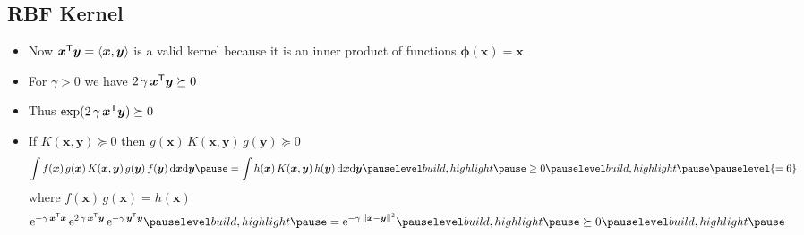 \begin{slide}
\section[-2]{RBF Kernel}

\begin{PauseHighLight}
  \begin{itemize}
  \item Now $\bm{x}^{\textsf{T}}\bm{y} = \left\langle {\bm{x}}, {\bm{y}}\right\rangle$ is a valid
    kernel because it is an inner product of functions $\bm{\phi}(\bm{x}) =
    \bm{x}$\pause
  \item For $\gamma>0$ we have $2\,\gamma\,\bm{x}^{\textsf{T}}\bm{y}\succeq 0$\pause
  \item Thus $\exp(2\,\gamma\,\bm{x}^{\textsf{T}}\bm{y}) \succeq 0$\pause
  \item If $K(\bm{x},\bm{y})\succeq0$ then
    $g(\bm{x})\,K(\bm{x},\bm{y})\,g(\bm{y}) \succeq 0$\pause
    {\small
    \begin{align*}
      \int f(\bm{x})\, g(\bm{x})\,K(\bm{x}, \bm{y}) \,g(\bm{y})\,
      f(\bm{y}) \, \dd \bm{x} \dd \bm{y}  \pause= \int
      h(\bm{x})\,K(\bm{x}, \bm{y}) \,h(\bm{y})\, \dd \bm{x} \dd
      \bm{y}\pauseb \geq 0 \pauseb \pauselevel{=6}
    \end{align*}}
    where $f(\bm{x})\, g(\bm{x})= h(\bm{x})$\pauseb{}
    \begin{align*}
      \e{-\gamma\,\bm{x}^\tr\bm{x}}\,\e{2\,\gamma\,\bm{x}^\tr\bm{y}}
      \,\e{- \gamma\,\bm{y}^\tr\bm{y}}\pauseb
      &= \e{-\gamma\,\|\bm{x}-\bm{y}\|^2}\pauseb \succeq
        0\pauseb
    \end{align*}
  \end{itemize}
\end{PauseHighLight}

\end{slide}

\Outline %

